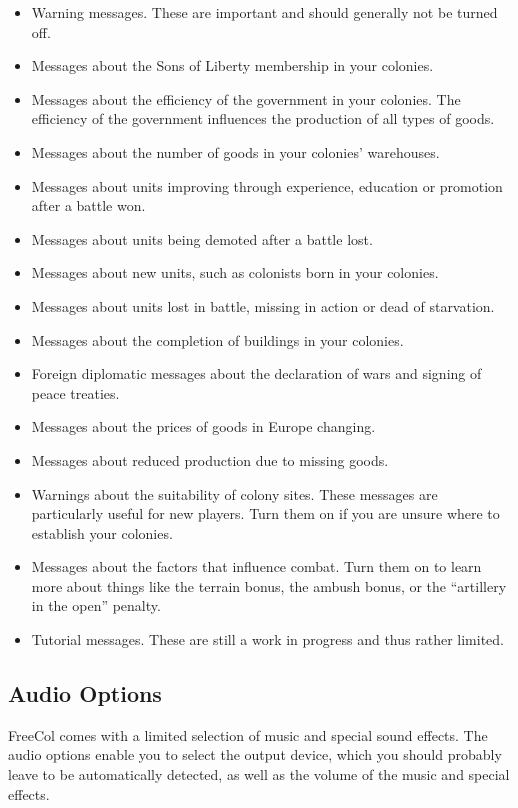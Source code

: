 \documentclass[12pt]{book}
\begin{document}
\begin{itemize}
\item Warning messages. These are important and should generally not
be turned off.
\item Messages about the Sons of Liberty membership in your colonies.
\item Messages about the efficiency of the government in your
colonies. The efficiency of the government influences the production
of all types of goods.
\item Messages about the number of goods in your colonies'
warehouses.
\item Messages about units improving through experience, education or
promotion after a battle won.
\item Messages about units being demoted after a battle lost.
\item Messages about new units, such as colonists born in your
colonies.
\item Messages about units lost in battle, missing in action or dead
of starvation.
\item Messages about the completion of buildings in your colonies.
\item Foreign diplomatic messages about the declaration of wars and
signing of peace treaties.
\item Messages about the prices of goods in Europe changing.
\item Messages about reduced production due to missing goods.
\item Warnings about the suitability of colony sites. These messages
  are particularly useful for new players. Turn them on if you are
  unsure where to establish your colonies.
\item Messages about the factors that influence combat. Turn them on
to learn more about things like the terrain bonus, the ambush bonus,
or the ``artillery in the open'' penalty.
\item Tutorial messages. These are still a work in progress and thus
  rather limited.
\end{itemize}

\hypertarget{audio options}{\subsection{Audio Options}}

FreeCol comes with a limited selection of music and special sound
effects. The audio options enable you to select the output device,
which you should probably leave to be automatically detected, as well
as the volume of the music and special effects.
\end{document}
